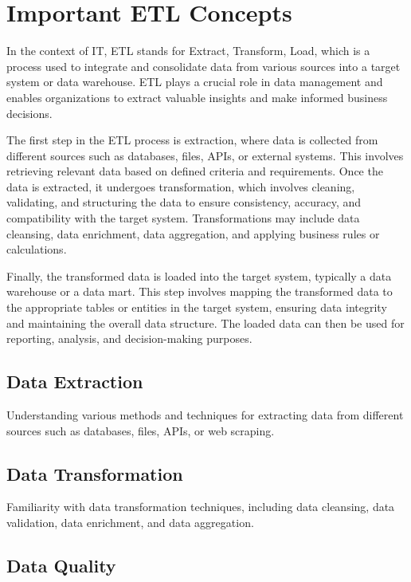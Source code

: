 \chapter{Important ETL Concepts}

In the context of IT, ETL stands for Extract, Transform, Load, which is a process used to integrate and consolidate data from various sources into a target system or data warehouse. ETL plays a crucial role in data management and enables organizations to extract valuable insights and make informed business decisions.

The first step in the ETL process is extraction, where data is collected from different sources such as databases, files, APIs, or external systems. This involves retrieving relevant data based on defined criteria and requirements. Once the data is extracted, it undergoes transformation, which involves cleaning, validating, and structuring the data to ensure consistency, accuracy, and compatibility with the target system. Transformations may include data cleansing, data enrichment, data aggregation, and applying business rules or calculations.

Finally, the transformed data is loaded into the target system, typically a data warehouse or a data mart. This step involves mapping the transformed data to the appropriate tables or entities in the target system, ensuring data integrity and maintaining the overall data structure. The loaded data can then be used for reporting, analysis, and decision-making purposes.

\section{Data Extraction}

Understanding various methods and techniques for extracting data from different sources such as databases, files, APIs, or web scraping.

\section{Data Transformation}

 Familiarity with data transformation techniques, including data cleansing, data validation, data enrichment, and data aggregation.
 
\section{Data Quality}


